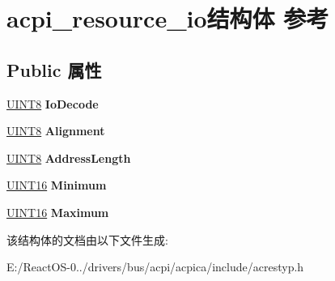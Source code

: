 \hypertarget{structacpi__resource__io}{}\section{acpi\+\_\+resource\+\_\+io结构体 参考}
\label{structacpi__resource__io}
\subsection*{Public 属性}
\begin{DoxyCompactItemize}
\item 
\mbox{\label{structacpi__resource__io_adc8f940c44ed02c0ced854c1367c8a4f}} 
\hyperlink{_processor_bind_8h_ab27e9918b538ce9d8ca692479b375b6a}{U\+I\+N\+T8} {\bfseries Io\+Decode}
\item 
\mbox{\label{structacpi__resource__io_a6ce8913f6dfa7161cf679f4353e75dc3}} 
\hyperlink{_processor_bind_8h_ab27e9918b538ce9d8ca692479b375b6a}{U\+I\+N\+T8} {\bfseries Alignment}
\item 
\mbox{\label{structacpi__resource__io_ae5e12b3ba6d2d38836595adeb29716f4}} 
\hyperlink{_processor_bind_8h_ab27e9918b538ce9d8ca692479b375b6a}{U\+I\+N\+T8} {\bfseries Address\+Length}
\item 
\mbox{\label{structacpi__resource__io_adda12a2b669ca2d3aeda4a281f38e6ca}} 
\hyperlink{_processor_bind_8h_a09f1a1fb2293e33483cc8d44aefb1eb1}{U\+I\+N\+T16} {\bfseries Minimum}
\item 
\mbox{\label{structacpi__resource__io_ab9ae9452946295b5ebe2ed29ca45bae9}} 
\hyperlink{_processor_bind_8h_a09f1a1fb2293e33483cc8d44aefb1eb1}{U\+I\+N\+T16} {\bfseries Maximum}
\end{DoxyCompactItemize}


该结构体的文档由以下文件生成\+:\begin{DoxyCompactItemize}
\item 
E\+:/\+React\+O\+S-\/0../drivers/bus/acpi/acpica/include/acrestyp.\+h\end{DoxyCompactItemize}
